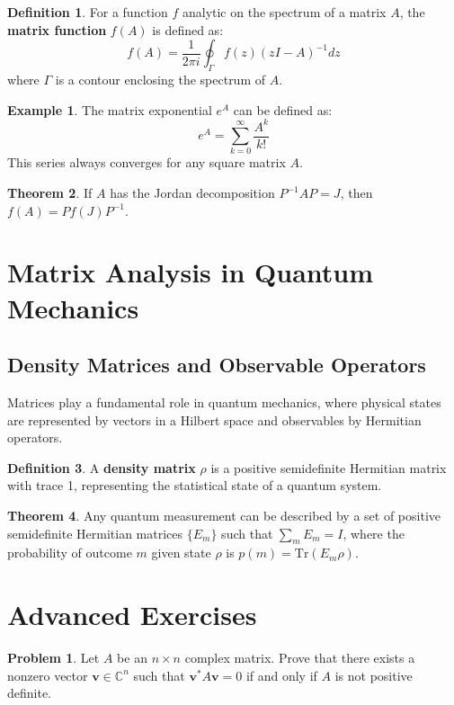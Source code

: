 \documentclass[12pt,a4paper]{article}
\theoremstyle{definition}
\newtheorem{theorem}{Theorem}[section]
\newtheorem{definition}[theorem]{Definition}
\newtheorem{example}{Example}[section]
\newtheorem{problem}{Problem}[section]
\begin{document}
\begin{definition}
For a function $f$ analytic on the spectrum of a matrix $A$, the \textbf{matrix function} $f(A)$ is defined as:
\[f(A) = \frac{1}{2\pi i} \oint_\Gamma f(z)(zI - A)^{-1} dz\]
where $\Gamma$ is a contour enclosing the spectrum of $A$.
\end{definition}

\begin{example}
The matrix exponential $e^A$ can be defined as:
\[e^A = \sum_{k=0}^{\infty} \frac{A^k}{k!}\]
This series always converges for any square matrix $A$.
\end{example}

\begin{theorem}
If $A$ has the Jordan decomposition $P^{-1}AP = J$, then $f(A) = Pf(J)P^{-1}$.
\end{theorem}

\section{Matrix Analysis in Quantum Mechanics}

\subsection{Density Matrices and Observable Operators}
Matrices play a fundamental role in quantum mechanics, where physical states are represented by vectors in a Hilbert space and observables by Hermitian operators.

\begin{definition}
A \textbf{density matrix} $\rho$ is a positive semidefinite Hermitian matrix with trace 1, representing the statistical state of a quantum system.
\end{definition}

\begin{theorem}
Any quantum measurement can be described by a set of positive semidefinite Hermitian matrices $\{E_m\}$ such that $\sum_m E_m = I$, where the probability of outcome $m$ given state $\rho$ is $p(m) = \text{Tr}(E_m \rho)$.
\end{theorem}

\section{Advanced Exercises}

\begin{problem}
Let $A$ be an $n \times n$ complex matrix. Prove that there exists a nonzero vector $\mathbf{v} \in \mathbb{C}^n$ such that $\mathbf{v}^*A\mathbf{v} = 0$ if and only if $A$ is not positive definite.
\end{problem}
\end{document}
